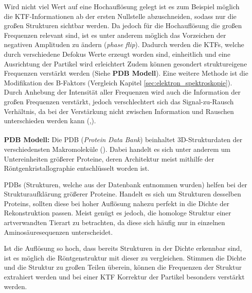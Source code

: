 Wird nicht viel Wert auf eine Hochauflösung gelegt ist es zum Beispiel möglich die KTF-Informationen ab der ersten Nullstelle abzuschneiden, sodass nur die großen Strukturen sichtbar werden.
Da jedoch für die Hochauflösung die großen Frequenzen relevant sind, ist es unter anderem möglich das Vorzeichen der negativen Amplituden zu ändern (\textit{phase flip}).
Dadurch werden die KTFs, welche durch verschiedene Defokus Werte erzeugt worden sind, einheitlich und eine Ausrichtung der Partikel wird erleichtert
Zudem können gesondert struktureigene Frequenzen verstärkt werden (Siehe \textbf{PDB Modell}).
Eine weitere Methode ist die Modifikation des B-Faktors (Vergleich Kapitel \ref{sec:elektron_spektroskopie}).
Durch Anhebung der Intensität aller Frequenzen wird auch die Information der großen Frequenzen verstärkt, jedoch verschlechtert sich das Signal-zu-Rausch Verhältnis, da bei der Verstärkung nicht zwischen Information und Rauschen unterschieden werden kann (\cite{aufloesung1},\cite{aufloesung2}).
\\
\\
\textbf{PDB Modell:}
Die PDB (\textit{Protein Data Bank}) beinhaltet 3D-Strukturdaten der verschiedensten Makromoleküle (\cite{pdb2}).
Dabei handelt es sich unter anderem um Untereinheiten größerer Proteine, deren Architektur meist mithilfe der Röntgenkristallographie entschlüsselt worden ist.

PDBs (Strukturen, welche aus der Datenbank entnommen wurden) helfen bei der Strukturaufklärung größerer Proteine.
Handelt es sich um Strukturen desselben Proteins, sollten diese bei hoher Auflösung nahezu perfekt in die Dichte der Rekonstruktion passen.
Meist genügt es jedoch, die homologe Struktur einer artverwandten Tierart zu betrachten, da diese sich häufig nur in einzelnen Aminosäuresequenzen unterscheidet.

Ist die Auflösung so hoch, dass bereits Strukturen in der Dichte erkennbar sind, ist es möglich die Röntgenstruktur mit dieser zu vergleichen.
Stimmen die Dichte und die Struktur zu großen Teilen überein, können die Frequenzen der Struktur extrahiert werden und bei einer KTF Korrektur der Partikel besonders verstärkt werden.

\FloatBarrier